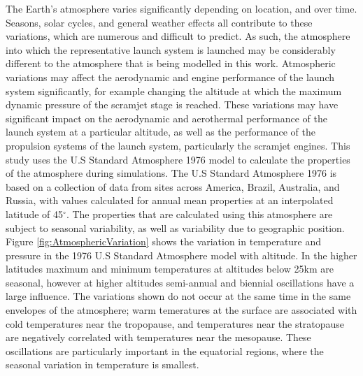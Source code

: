 The Earth's atmosphere varies significantly depending on location, and over time. Seasons, solar cycles, and general weather effects all contribute to these variations, which are numerous and difficult to predict. As such, the atmosphere into which the representative launch system is launched may be considerably different to the atmosphere that is being modelled in this work. 
Atmospheric variations may affect the aerodynamic and engine performance of the launch system significantly, for example changing the altitude at which the maximum dynamic pressure of the scramjet stage is reached. These variations may have significant impact on the aerodynamic and aerothermal performance of the launch system at a particular altitude, as well as the performance of the propulsion systems of the launch system, particularly the scramjet engines. 
This study uses the U.S Standard Atmosphere 1976 model\cite{Administration1976} to calculate the properties of the atmosphere during simulations. The U.S Standard Atmosphere 1976 is based on a collection of data from sites across America, Brazil, Australia, and Russia, with values calculated for annual mean properties at an interpolated latitude of 45$^\circ$\cite{Administration1976}. The properties that are calculated using this atmosphere are subject to seasonal variability, as well as variability due to geographic position. Figure \ref{fig:AtmosphericVariation} shows the variation in temperature and pressure in the 1976 U.S Standard Atmosphere model with altitude. In the higher latitudes maximum and minimum temperatures at altitudes below 25km are seasonal, however at higher altitudes semi-annual and biennial oscillations have a large influence\cite{Administration1976}. The variations shown do not occur at the same time in the same envelopes of the atmosphere; warm temeratures at the surface are associated with cold temperatures near the tropopause, and temperatures near the stratopause are negatively correlated with temperatures near the mesopause\cite{Administration1976}. These oscillations are particularly important in the equatorial regions, where the seasonal variation in temperature is smallest. 




